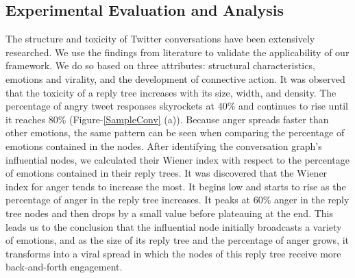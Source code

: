 \subsection{Experimental Evaluation and Analysis}
The structure and toxicity of Twitter conversations have been extensively researched. We use the findings from literature to validate the applicability of our framework. We do so based on three attributes: structural characteristics, emotions and virality, and the development of connective action.  It was observed that the toxicity of a reply tree increases with its size, width, and density. The percentage of angry tweet responses skyrockets at 40\% and continues to rise until it reaches 80\% (Figure-\ref{SampleConv} (a)). Because anger spreads faster than other emotions, the same pattern can be seen when comparing the percentage of emotions contained in the nodes. After identifying the conversation graph's influential nodes, we calculated their Wiener index with respect to the percentage of emotions contained in their reply trees. It was discovered that the Wiener index for anger tends to increase the most. It begins low and starts to rise as the percentage of anger in the reply tree increases. It peaks at 60\% anger in the reply tree nodes and then drops by a small value before plateauing at the end. This leads us to the conclusion that the influential node initially broadcasts a variety of emotions, and as the size of its reply tree and the percentage of anger grows, it transforms into a viral spread in which the nodes of this reply tree receive more back-and-forth engagement. 
